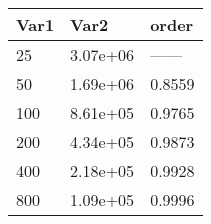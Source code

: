\begin{tabular}{lll}
Var1 & Var2 & order \\ 
\hline 
25 & 3.07e+06 & ------ \\ 
50 & 1.69e+06 & 0.8559 \\ 
100 & 8.61e+05 & 0.9765 \\ 
200 & 4.34e+05 & 0.9873 \\ 
400 & 2.18e+05 & 0.9928 \\ 
800 & 1.09e+05 & 0.9996 \\ 
\hline 
\end{tabular}